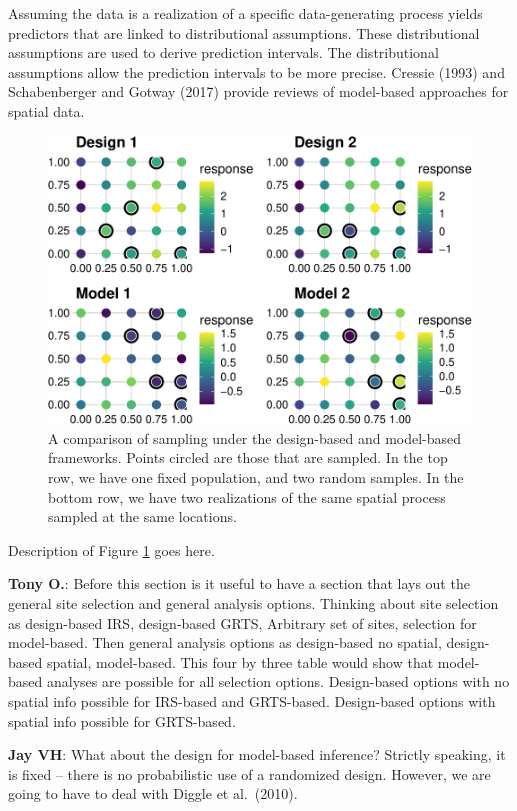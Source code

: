 \documentclass[]{elsarticle} %
\begin{document}
Assuming the data is a realization of a specific data-generating process
yields predictors that are linked to distributional assumptions. These
distributional assumptions are used to derive prediction intervals. The
distributional assumptions allow the prediction intervals to be more
precise. Cressie (1993) and Schabenberger and Gotway (2017) provide
reviews of model-based approaches for spatial data.

\begin{figure}
\includegraphics[width=1\linewidth]{SpatialDVM_Manuscript_files/figure-latex/fig1-1} \caption{A comparison of sampling under the design-based and model-based frameworks. Points circled are those that are sampled. In the top row, we have one fixed population, and two random samples. In the bottom row, we have two realizations of the same spatial process sampled at the same locations.}\label{fig:fig1}
\end{figure}

Description of Figure \ref{fig:fig1} goes here.

\textbf{Tony O.}: Before this section is it useful to have a section
that lays out the general site selection and general analysis options.
Thinking about site selection as design-based IRS, design-based GRTS,
Arbitrary set of sites, selection for model-based. Then general analysis
options as design-based no spatial, design-based spatial, model-based.
This four by three table would show that model-based analyses are
possible for all selection options. Design-based options with no spatial
info possible for IRS-based and GRTS-based. Design-based options with
spatial info possible for GRTS-based.

\textbf{Jay VH}: What about the design for model-based inference?
Strictly speaking, it is fixed -- there is no probabilistic use of a
randomized design. However, we are going to have to deal with Diggle et
al.~(2010).
\end{document}

